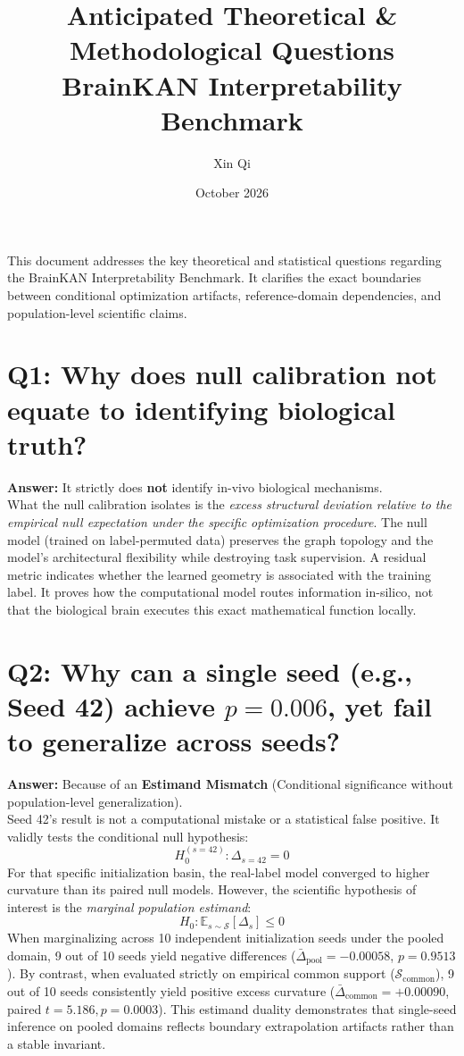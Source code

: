 \documentclass{article}
\title{Anticipated Theoretical \& Methodological Questions \\ \large BrainKAN Interpretability Benchmark}
\author{Xin Qi}
\date{October 2026}
\begin{document}
\maketitle

This document addresses the key theoretical and statistical questions regarding the BrainKAN Interpretability Benchmark. It clarifies the exact boundaries between conditional optimization artifacts, reference-domain dependencies, and population-level scientific claims.

\section*{Q1: Why does null calibration not equate to identifying biological truth?}
\textbf{Answer:} It strictly does \textbf{not} identify in-vivo biological mechanisms. \\
What the null calibration isolates is the \textit{excess structural deviation relative to the empirical null expectation under the specific optimization procedure}. The null model (trained on label-permuted data) preserves the graph topology and the model's architectural flexibility while destroying task supervision. A residual metric indicates whether the learned geometry is associated with the training label. It proves how the computational model routes information in-silico, not that the biological brain executes this exact mathematical function locally.

\section*{Q2: Why can a single seed (e.g., Seed 42) achieve $p = 0.006$, yet fail to generalize across seeds?}
\textbf{Answer:} Because of an \textbf{Estimand Mismatch} (Conditional significance without population-level generalization). \\
Seed 42's result is not a computational mistake or a statistical false positive. It validly tests the conditional null hypothesis:
\begin{equation}
H_0^{(s=42)}: \Delta_{s=42} = 0
\end{equation}
For that specific initialization basin, the real-label model converged to higher curvature than its paired null models. However, the scientific hypothesis of interest is the \textit{marginal population estimand}:
\begin{equation}
H_0: \mathbb{E}_{s \sim \mathcal{S}} [\Delta_s] \le 0
\end{equation}
When marginalizing across 10 independent initialization seeds under the pooled domain, 9 out of 10 seeds yield negative differences ($\bar{\Delta}_{\mathrm{pool}} = -0.00058$, $p = 0.9513$). By contrast, when evaluated strictly on empirical common support ($\mathcal{S}_{\mathrm{common}}$), 9 out of 10 seeds consistently yield positive excess curvature ($\bar{\Delta}_{\mathrm{common}} = +0.00090$, paired $t = 5.186, p = 0.0003$). This estimand duality demonstrates that single-seed inference on pooled domains reflects boundary extrapolation artifacts rather than a stable invariant.
\end{document}
